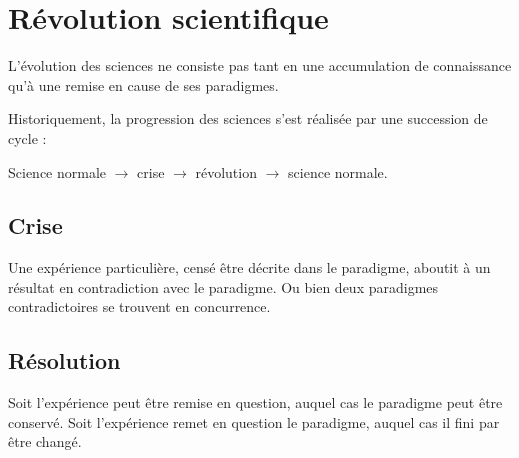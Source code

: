 

\section{Révolution scientifique}

L'évolution des sciences ne consiste pas tant en une accumulation de connaissance qu'à une remise en cause de ses paradigmes.


Historiquement, la progression des sciences s'est réalisée par une succession de cycle :
\begin{center}
Science normale $\to$ crise $\to$ révolution $\to$ science normale.
\end{center}


  \subsection{Crise}

Une expérience particulière, censé être décrite dans le paradigme, aboutit à un résultat en contradiction avec le paradigme.
Ou bien deux paradigmes contradictoires se trouvent en concurrence.

  \subsection{Résolution}


Soit l'expérience peut être remise en question, auquel cas le paradigme peut être conservé. Soit l'expérience remet en question le paradigme, auquel cas il fini par être changé.





